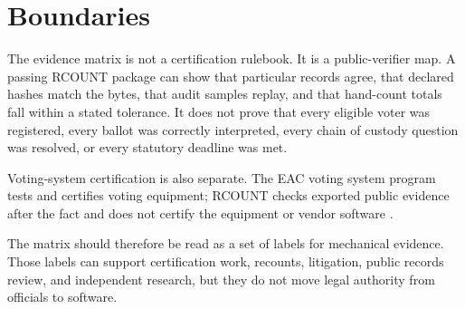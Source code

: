 \section{Boundaries}

The evidence matrix is not a certification rulebook. It is a public-verifier
map. A passing RCOUNT package can show that particular records agree, that
declared hashes match the bytes, that audit samples replay, and that hand-count
totals fall within a stated tolerance. It does not prove that every eligible
voter was registered, every ballot was correctly interpreted, every chain of
custody question was resolved, or every statutory deadline was met.

Voting-system certification is also separate. The EAC voting system program
tests and certifies voting equipment; RCOUNT checks exported public evidence
after the fact and does not certify the equipment or vendor software
\citep{eac-voting-system-certification}.

The matrix should therefore be read as a set of labels for mechanical evidence.
Those labels can support certification work, recounts, litigation, public
records review, and independent research, but they do not move legal authority
from officials to software.
